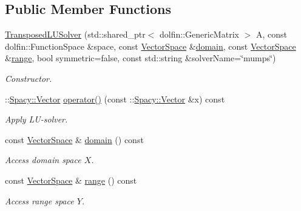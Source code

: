 \subsection*{Public Member Functions}
\begin{DoxyCompactItemize}
\item 
\hyperlink{classSpacy_1_1FEniCS_1_1TransposedLUSolver_ac27b0869e7851bafe8e161482f772b83}{Transposed\+L\+U\+Solver} (std\+::shared\+\_\+ptr$<$ dolfin\+::\+Generic\+Matrix $>$ A, const dolfin\+::\+Function\+Space \&space, const \hyperlink{classSpacy_1_1VectorSpace}{Vector\+Space} \&\hyperlink{classSpacy_1_1OperatorBase_a2588f9b3e0188820c4c494e63293dc6f}{domain}, const \hyperlink{classSpacy_1_1VectorSpace}{Vector\+Space} \&\hyperlink{classSpacy_1_1OperatorBase_ab19d3b7a6f290b1079248f1e567e53d6}{range}, bool symmetric=false, const std\+::string \&solver\+Name=\char`\"{}mumps\char`\"{})
\begin{DoxyCompactList}\small\item\em Constructor. \end{DoxyCompactList}\item 
\+::\hyperlink{classSpacy_1_1Vector}{Spacy\+::\+Vector} \hyperlink{classSpacy_1_1FEniCS_1_1TransposedLUSolver_a41e978758fb3775d56ffa32d5a05431f}{operator()} (const \+::\hyperlink{classSpacy_1_1Vector}{Spacy\+::\+Vector} \&x) const 
\begin{DoxyCompactList}\small\item\em Apply L\+U-\/solver. \end{DoxyCompactList}\item 
\hypertarget{classSpacy_1_1OperatorBase_a2588f9b3e0188820c4c494e63293dc6f}{}const \hyperlink{classSpacy_1_1VectorSpace}{Vector\+Space} \& \hyperlink{classSpacy_1_1OperatorBase_a2588f9b3e0188820c4c494e63293dc6f}{domain} () const \label{classSpacy_1_1OperatorBase_a2588f9b3e0188820c4c494e63293dc6f}

\begin{DoxyCompactList}\small\item\em Access domain space $X$. \end{DoxyCompactList}\item 
\hypertarget{classSpacy_1_1OperatorBase_ab19d3b7a6f290b1079248f1e567e53d6}{}const \hyperlink{classSpacy_1_1VectorSpace}{Vector\+Space} \& \hyperlink{classSpacy_1_1OperatorBase_ab19d3b7a6f290b1079248f1e567e53d6}{range} () const \label{classSpacy_1_1OperatorBase_ab19d3b7a6f290b1079248f1e567e53d6}

\begin{DoxyCompactList}\small\item\em Access range space $Y$. \end{DoxyCompactList}\end{DoxyCompactItemize}


